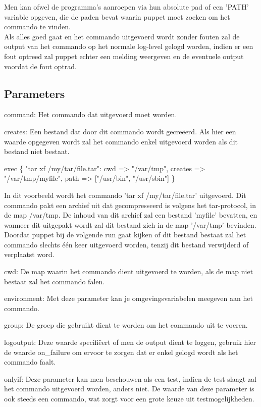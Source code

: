	Men kan ofwel de programma's aanroepen via hun absolute pad of een 'PATH' variable opgeven, die de paden bevat waarin puppet moet zoeken om het commando te vinden.\\
	Als alles goed gaat en het commando uitgevoerd wordt zonder fouten zal de output van het commando op het normale log-level gelogd worden, indien er een fout optreed zal puppet echter een melding weergeven en de eventuele output voordat de fout optrad.\\


\subsection{Parameters}
		command:
		Het commando dat uitgevoerd moet worden.

		creates:
		Een bestand dat door dit commando wordt gecre\"{e}erd.
		Als hier een waarde opgegeven wordt zal het commando enkel uitgevoerd worden als dit bestand niet bestaat.

			exec \{ "tar xf /my/tar/file.tar":
				cwd => "/var/tmp",
				creates => "/var/tmp/myfile",
				path => ["/usr/bin", "/usr/sbin"]
			\}

		In dit voorbeeld wordt het commando 'tar xf /my/tar/file.tar' uitgevoerd.
		Dit commando pakt een archief uit dat gecompresseerd is volgens het tar-protocol, in de map /var/tmp.
		De inhoud van dit archief zal een bestand 'myfile' bevatten, en wanneer dit uitgepakt wordt zal dit bestand zich in de map '/var/tmp' bevinden.
		Doordat puppet bij de volgende run gaat kijken of dit bestand bestaat zal het commando slechts \'e\'en keer uitgevoerd worden, tenzij dit bestand verwijderd of verplaatst word.

		cwd:
		De map waarin het commando dient uitgevoerd te worden, als de map niet bestaat zal het commando falen.

		environment:
		Met deze parameter kan je omgevingsvariabelen meegeven aan het commando.

		group:
		De groep die gebruikt dient te worden om het commando uit te voeren.

		logoutput:
		Deze waarde specifi\"{e}ert of men de output dient te loggen, gebruik hier de waarde on\_failure om ervoor te zorgen dat er enkel gelogd wordt als het commando faalt.

		onlyif:
		Deze parameter kan men beschouwen als een test, indien de test slaagt zal het commando uitgevoerd worden, anders niet.
		De waarde van deze parameter is ook steeds een commando, wat zorgt voor een grote keuze uit testmogelijkheden.

